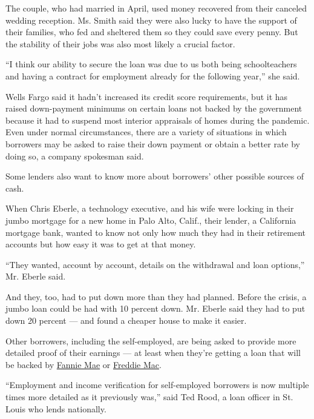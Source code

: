 The couple, who had married in April, used money recovered from their
canceled wedding reception. Ms. Smith said they were also lucky to have
the support of their families, who fed and sheltered them so they could
save every penny. But the stability of their jobs was also most likely a
crucial factor.

``I think our ability to secure the loan was due to us both being
schoolteachers and having a contract for employment already for the
following year,'' she said.

Wells Fargo said it hadn't increased its credit score requirements, but
it has raised down-payment minimums on certain loans not backed by the
government because it had to suspend most interior appraisals of homes
during the pandemic. Even under normal circumstances, there are a
variety of situations in which borrowers may be asked to raise their
down payment or obtain a better rate by doing so, a company spokesman
said.

Some lenders also want to know more about borrowers' other possible
sources of cash.

When Chris Eberle, a technology executive, and his wife were locking in
their jumbo mortgage for a new home in Palo Alto, Calif., their lender,
a California mortgage bank, wanted to know not only how much they had in
their retirement accounts but how easy it was to get at that money.

``They wanted, account by account, details on the withdrawal and loan
options,'' Mr. Eberle said.

And they, too, had to put down more than they had planned. Before the
crisis, a jumbo loan could be had with 10 percent down. Mr. Eberle said
they had to put down 20 percent --- and found a cheaper house to make it
easier.

Other borrowers, including the self-employed, are being asked to provide
more detailed proof of their earnings --- at least when they're getting
a loan that will be backed by
\href{https://singlefamily.fanniemae.com/media/22316/display?_ga=2.27818620.1955261175.1593457830-553926868.1583167746\&_gac=1.52708252.1591220517.EAIaIQobChMIyYH3gc7m6QIVlovICh2LUgv0EAMYASAAEgJkPvD_BwE}{Fannie
Mae} or
\href{https://guide.freddiemac.com/app/guide/bulletin/2020-19}{Freddie
Mac}.

``Employment and income verification for self-employed borrowers is now
multiple times more detailed as it previously was,'' said Ted Rood, a
loan officer in St. Louis who lends nationally.

